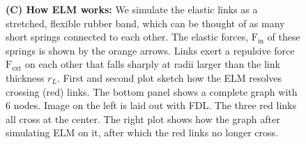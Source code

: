\documentclass[nofootinbib,preprint,floatfix,titlepage,endfloats]{revtex4} %
\begin{document}
\begin{figure}
{{    {\bf(C) How ELM works:} We simulate the elastic links as a stretched, flexible rubber band, which can be thought of as many short springs connected to each other. 
    The elastic forces, $\mathrm{F}_{\mathrm{in}}$ of these springs is shown by the orange arrows.
    Links exert a repulsive force $\mathrm{F}_{\mathrm{ext}}$  on each other that falls sharply at radii larger than the link thickness $r_L$. 
    First and second plot sketch how the ELM resolves crossing (red) links. The bottom panel shows a complete graph with 6 nodes. Image on the left is laid out with FDL. The three red links all cross at the center. The right plot shows how the graph after simulating ELM on it, after which the red links no longer cross. 
    } %
    }
    \label{fig:crossings}
\end{figure}
\end{document}
